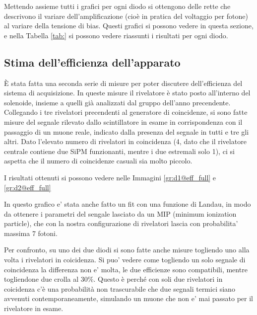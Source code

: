 Mettendo assieme tutti i grafici per ogni diodo si ottengono delle rette che descrivono il variare dell'amplificazione (cioè in pratica del voltaggio per fotone) al variare
della tensione di bias. Questi grafici si possono vedere in questa sezione, e nella Tabella \ref{tab:} si possono vedere riassunti i risultati per ogni diodo.

\subsection{Stima dell'efficienza dell'apparato}
\`E stata fatta una seconda serie di misure per poter discutere dell'efficienza del sistema di acquisizione. In queste misure il rivelatore \`e stato posto all'interno del solenoide, insieme a quelli gi\`a analizzati dal gruppo dell'anno precendente. Collegando i tre rivelatori precendenti al generatore di coincidenze, si sono fatte misure del segnale rilevato dallo scintillatore in esame in corrispondenza con il passaggio di un muone reale, indicato dalla presenza del segnale in tutti e tre gli altri. Dato l'elevato numero di rivelatori in coincidenza (4, dato che il rivelatore centrale contiene due SiPM funzionanti, mentre i due estremali solo 1), ci si aspetta che il numero di coincidenze casuali sia molto piccolo.

I risultati ottenuti si possono vedere nelle Immagini \ref{gr:d1@eff_full} e \ref{gr:d2@eff_full}


In questo grafico e' stata anche fatto un fit con una funzione di Landau, in modo da ottenere i parametri del sengale lasciato da un MIP (minimum ionization particle), che con la nostra configurazione di rivelatori lascia con probabilita' massima 7 fotoni.

Per confronto, su uno dei due diodi si sono fatte anche misure togliendo uno alla volta i rivelatori in coicidenza. Si puo' vedere come togliendo un solo segnale di coincidenza la differenza non e' molta, le due efficienze sono compatibili, mentre togliendone due crolla al 30\%. Questo \`e perch\'e con soli due rivelatori in coicidenza c'\`e una probabilit\`a non trascurabile che due segnali termici siano avvenuti contemporaneamente, simulando un muone che non e' mai passato per il rivelatore in esame.

